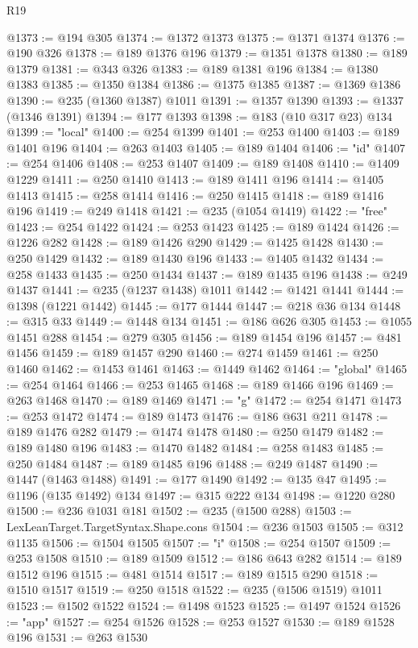 \begin{lexlean}{R19}
\begin{coremodule}
@1373 := @194 @305
@1374 := @1372 @1373
@1375 := @1371 @1374
@1376 := @190 @326
@1378 := @189 @1376 @196
@1379 := @1351 @1378
@1380 := @189 @1379
@1381 := @343 @326
@1383 := @189 @1381 @196
@1384 := @1380 @1383
@1385 := @1350 @1384
@1386 := @1375 @1385
@1387 := @1369 @1386
@1390 := @235 (@1360 @1387) @1011
@1391 := @1357 @1390
@1393 := @1337 (@1346 @1391)
@1394 := @177 @1393
@1398 := @183 (@10 @317 @23) @134
@1399 := "local"
@1400 := @254 @1399
@1401 := @253 @1400
@1403 := @189 @1401 @196
@1404 := @263 @1403
@1405 := @189 @1404
@1406 := "id"
@1407 := @254 @1406
@1408 := @253 @1407
@1409 := @189 @1408
@1410 := @1409 @1229
@1411 := @250 @1410
@1413 := @189 @1411 @196
@1414 := @1405 @1413
@1415 := @258 @1414
@1416 := @250 @1415
@1418 := @189 @1416 @196
@1419 := @249 @1418
@1421 := @235 (@1054 @1419)
@1422 := "free"
@1423 := @254 @1422
@1424 := @253 @1423
@1425 := @189 @1424
@1426 := @1226 @282
@1428 := @189 @1426 @290
@1429 := @1425 @1428
@1430 := @250 @1429
@1432 := @189 @1430 @196
@1433 := @1405 @1432
@1434 := @258 @1433
@1435 := @250 @1434
@1437 := @189 @1435 @196
@1438 := @249 @1437
@1441 := @235 (@1237 @1438) @1011
@1442 := @1421 @1441
@1444 := @1398 (@1221 @1442)
@1445 := @177 @1444
@1447 := @218 @36 @134
@1448 := @315 @33
@1449 := @1448 @134
@1451 := @186 @626 @305
@1453 := @1055 @1451 @288
@1454 := @279 @305
@1456 := @189 @1454 @196
@1457 := @481 @1456
@1459 := @189 @1457 @290
@1460 := @274 @1459
@1461 := @250 @1460
@1462 := @1453 @1461
@1463 := @1449 @1462
@1464 := "global"
@1465 := @254 @1464
@1466 := @253 @1465
@1468 := @189 @1466 @196
@1469 := @263 @1468
@1470 := @189 @1469
@1471 := "g"
@1472 := @254 @1471
@1473 := @253 @1472
@1474 := @189 @1473
@1476 := @186 @631 @211
@1478 := @189 @1476 @282
@1479 := @1474 @1478
@1480 := @250 @1479
@1482 := @189 @1480 @196
@1483 := @1470 @1482
@1484 := @258 @1483
@1485 := @250 @1484
@1487 := @189 @1485 @196
@1488 := @249 @1487
@1490 := @1447 (@1463 @1488)
@1491 := @177 @1490
@1492 := @135 @47
@1495 := @1196 (@135 @1492) @134
@1497 := @315 @222 @134
@1498 := @1220 @280
@1500 := @236 @1031 @181
@1502 := @235 (@1500 @288)
@1503 := LexLeanTarget.TargetSyntax.Shape.cons
@1504 := @236 @1503
@1505 := @312 @1135
@1506 := @1504 @1505
@1507 := "i"
@1508 := @254 @1507
@1509 := @253 @1508
@1510 := @189 @1509
@1512 := @186 @643 @282
@1514 := @189 @1512 @196
@1515 := @481 @1514
@1517 := @189 @1515 @290
@1518 := @1510 @1517
@1519 := @250 @1518
@1522 := @235 (@1506 @1519) @1011
@1523 := @1502 @1522
@1524 := @1498 @1523
@1525 := @1497 @1524
@1526 := "app"
@1527 := @254 @1526
@1528 := @253 @1527
@1530 := @189 @1528 @196
@1531 := @263 @1530

\end{coremodule}
\end{lexlean}

